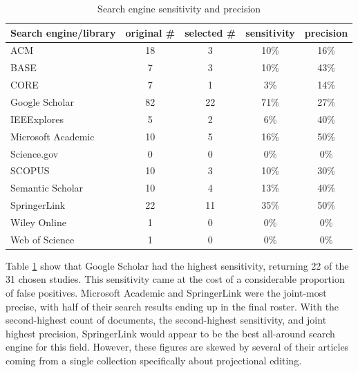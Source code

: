 \begin{table}
    \begin{center}
        \begin{tabular}{ | l | c | c | c | c |} 
            \hline
            Search engine/library     & original \# & selected \# & sensitivity & precision\\
            \hline
            \hline
            ACM                        & 18          & 3           & 10\%        &  16\%    \\
            BASE                       & 7           & 3           & 10\%        &  43\%    \\
            CORE                       & 7           & 1           &  3\%        &  14\%    \\
            Google Scholar             & 82          & 22          & 71\%        &  27\%    \\
            IEEExplores                & 5           & 2           &  6\%        &  40\%    \\
            Microsoft Academic         & 10          & 5           & 16\%        &  50\%    \\
            Science.gov                & 0           & 0           &  0\%        &   0\%    \\
            SCOPUS                     & 10          & 3           & 10\%        &  30\%    \\
            Semantic Scholar           & 10          & 4           & 13\%        &  40\%    \\
            SpringerLink               & 22          & 11          & 35\%        &  50\%    \\
            Wiley Online               & 1           & 0           &  0\%        &   0\%    \\
            Web of Science             & 1           & 0           &  0\%        &   0\%    \\
            \hline
        \end{tabular}
    \end{center}
    \caption{Search engine sensitivity and precision}
    \label{table:sensitivity_precision}
\end{table}

Table \ref{table:sensitivity_precision} show that Google Scholar had the highest sensitivity, returning 22 of the 31 chosen studies.
This sensitivity came at the cost of a considerable proportion of false positives.
Microsoft Academic and SpringerLink were the joint-most precise, with half of their search results ending up in the final roster.
With the second-highest count of documents, the second-highest sensitivity, and joint highest precision, SpringerLink would appear to be the best all-around search engine for this field.
However, these figures are skewed by several of their articles coming from a single collection specifically about projectional editing.

